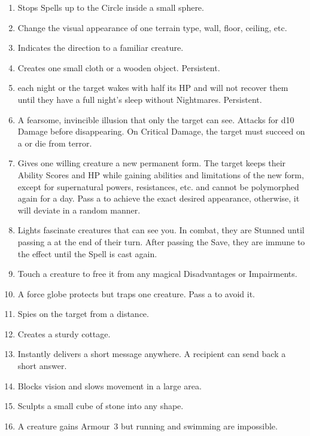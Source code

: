 \documentclass[itdr/core]{subfiles}
\begin{document}
\begin{enumerate}
	\item {} Stops Spells up to the  Circle inside a small sphere.
	\item {} Change the visual appearance of one terrain type, wall, floor, ceiling, etc.
	\item {} Indicates the direction to a familiar creature.
	\item {} Creates one small cloth or a wooden object. Persistent.
	\item {}  each night or the target wakes with half its HP and will not recover them until they have a full night's sleep without Nightmares. Persistent.
	\item {} A fearsome, invincible illusion that only the target can see. Attacks for d10 Damage before disappearing. On Critical Damage, the target must succeed on a  or die from terror.\tight
	\item {} Gives one willing creature a new permanent form. The target keeps their Ability Scores and HP while gaining abilities and limitations of the new form, except for supernatural powers, resistances, etc. and cannot be polymorphed again for a day. Pass a  to achieve the exact desired appearance, otherwise, it will deviate in a random manner.
	\item {} Lights fascinate creatures that can see you. In combat, they are Stunned until passing a  at the end of their turn. After passing the Save, they are immune to the effect until the Spell is cast again.
	\item {} Touch a creature to free it from any magical Disadvantages or Impairments.
	\item {} A force globe protects but traps one creature. Pass a  to avoid it.
	\item {} Spies on the target from a distance.
	\item {} Creates a sturdy cottage.
	\item {} Instantly delivers a short message anywhere. A recipient can send back a short \mbox{answer}.
	\item {} Blocks vision and slows movement in a large area.
	\item {} Sculpts a small cube of stone into any shape.
	\item {} A creature gains Armour~3 but running and swimming are impossible.

\end{enumerate}
\end{document}
